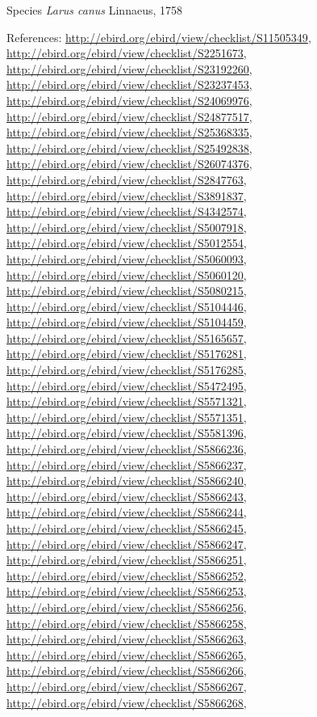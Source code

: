 \documentclass[9pt, article]{memoir}
\begin{document}
\begin{multicols}{2}
\vspace{6pt}\noindent\hspace{36pt}Species \textit{Larus canus} Linnaeus, 1758


\vspace{6pt}References: 
\url{http://ebird.org/ebird/view/checklist/S11505349}, 
\url{http://ebird.org/ebird/view/checklist/S2251673}, 
\url{http://ebird.org/ebird/view/checklist/S23192260}, 
\url{http://ebird.org/ebird/view/checklist/S23237453}, 
\url{http://ebird.org/ebird/view/checklist/S24069976}, 
\url{http://ebird.org/ebird/view/checklist/S24877517}, 
\url{http://ebird.org/ebird/view/checklist/S25368335}, 
\url{http://ebird.org/ebird/view/checklist/S25492838}, 
\url{http://ebird.org/ebird/view/checklist/S26074376}, 
\url{http://ebird.org/ebird/view/checklist/S2847763}, 
\url{http://ebird.org/ebird/view/checklist/S3891837}, 
\url{http://ebird.org/ebird/view/checklist/S4342574}, 
\url{http://ebird.org/ebird/view/checklist/S5007918}, 
\url{http://ebird.org/ebird/view/checklist/S5012554}, 
\url{http://ebird.org/ebird/view/checklist/S5060093}, 
\url{http://ebird.org/ebird/view/checklist/S5060120}, 
\url{http://ebird.org/ebird/view/checklist/S5080215}, 
\url{http://ebird.org/ebird/view/checklist/S5104446}, 
\url{http://ebird.org/ebird/view/checklist/S5104459}, 
\url{http://ebird.org/ebird/view/checklist/S5165657}, 
\url{http://ebird.org/ebird/view/checklist/S5176281}, 
\url{http://ebird.org/ebird/view/checklist/S5176285}, 
\url{http://ebird.org/ebird/view/checklist/S5472495}, 
\url{http://ebird.org/ebird/view/checklist/S5571321}, 
\url{http://ebird.org/ebird/view/checklist/S5571351}, 
\url{http://ebird.org/ebird/view/checklist/S5581396}, 
\url{http://ebird.org/ebird/view/checklist/S5866236}, 
\url{http://ebird.org/ebird/view/checklist/S5866237}, 
\url{http://ebird.org/ebird/view/checklist/S5866240}, 
\url{http://ebird.org/ebird/view/checklist/S5866243}, 
\url{http://ebird.org/ebird/view/checklist/S5866244}, 
\url{http://ebird.org/ebird/view/checklist/S5866245}, 
\url{http://ebird.org/ebird/view/checklist/S5866247}, 
\url{http://ebird.org/ebird/view/checklist/S5866251}, 
\url{http://ebird.org/ebird/view/checklist/S5866252}, 
\url{http://ebird.org/ebird/view/checklist/S5866253}, 
\url{http://ebird.org/ebird/view/checklist/S5866256}, 
\url{http://ebird.org/ebird/view/checklist/S5866258}, 
\url{http://ebird.org/ebird/view/checklist/S5866263}, 
\url{http://ebird.org/ebird/view/checklist/S5866265}, 
\url{http://ebird.org/ebird/view/checklist/S5866266}, 
\url{http://ebird.org/ebird/view/checklist/S5866267}, 
\url{http://ebird.org/ebird/view/checklist/S5866268}, 

\end{multicols}
\end{document}
